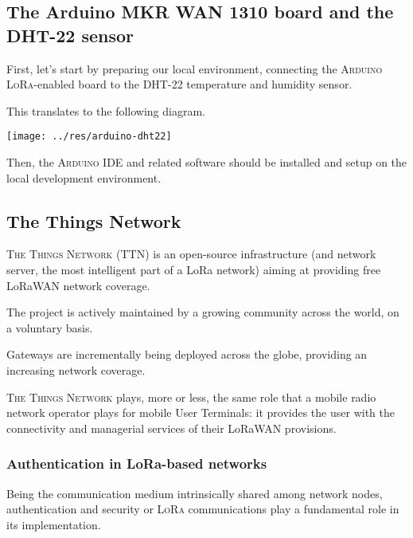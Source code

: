 \documentclass[a4paper,11pt]{article} %
\begin{document}
    \subsection{The Arduino MKR WAN 1310 board and the DHT-22 sensor}\label{subsec:the-arduino-mkr-wan-1310-board-and-the-dht-22-sensor}

    First, let's start by preparing our local environment, connecting the \textsc{Arduino} \textsc{LoRa}-enabled board to the \textsc{DHT-22} temperature and humidity sensor.

    \smallskip

    This translates to the following diagram.

    \texttt{[image: ../res/arduino-dht22]}

    Then, the \textsc{Arduino IDE} and related software should be installed and setup on the local development environment.

    \subsection{The Things Network}\label{subsec:the-things-network}

    \textsc{The Things Network} (TTN) is an open-source infrastructure (and network server, the most intelligent part of a LoRa network) aiming at providing free LoRaWAN network coverage.

    \smallskip

    The project is actively maintained by a growing community across the world, on a voluntary basis.

    \smallskip

    Gateways are incrementally being deployed across the globe, providing an increasing network coverage.

    \medskip

    \textsc{The Things Network} plays, more or less, the same role that a mobile radio network operator plays for mobile User Terminals: it provides the user with the connectivity and managerial services of their LoRaWAN provisions.

    \smallskip

    \subsubsection{Authentication in LoRa-based networks}

    Being the communication medium intrinsically shared among network nodes, authentication and security or \textsc{LoRa} communications play a fundamental role in its implementation.
\end{document}
